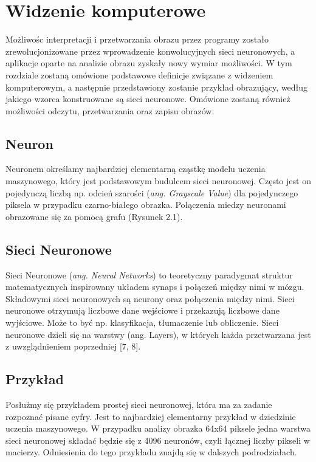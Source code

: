 \documentclass[openright]{xmgr}
\begin{document}
	


\chapter{Widzenie komputerowe  }

\indent \indent Możliwośc interpretacji i przetwarzania obrazu przez programy zostało zrewolucjonizowane przez wprowadzenie konwolucyjnych sieci neuronowych, a aplikacje oparte na analizie obrazu zyskały nowy wymiar możliwości. W tym rozdziale zostaną omówione podstawowe definicje związane z widzeniem komputerowym, a następnie przedstawiony zostanie przykład obrazujący, według jakiego wzorca konstruowane są sieci neuronowe. Omówione zostaną również 
możliwości odczytu, przetwarzania oraz zapisu obrazów.

\section{Neuron  \label{s:dsssl}}

\indent \indent Neuronem określamy najbardziej elementarną cząstkę modelu uczenia maszynowego, który jest podstawowym budulcem sieci neuronowej. Często jest on pojedynczą liczbą np. odcień szarości (\textit{ang. Grayscale Value}) dla pojedynczego piksela w przypadku czarno-białego obrazka. Połączenia miedzy neuronami obrazowane się za pomocą grafu (Rysunek 2.1).

\section{Sieci Neuronowe   \label{s:dsssl}}

\indent \indent Sieci Neuronowe (\textit{ang. Neural Networks}) to teoretyczny paradygmat struktur matematycznych inspirowany układem synaps i połączeń między nimi w mózgu. Składowymi sieci neuronowych są neurony oraz połączenia między nimi. Sieci neuronowe otrzymują liczbowe dane wejściowe i przekazują liczbowe dane wyjściowe. Może to być np. klasyfikacja, tłumaczenie lub obliczenie. Sieci neuronowe dzieli się na warstwy (ang. Layers), w których każda przetwarzana jest z uwzglądnieniem poprzedniej [7, 8].



\section{Przykład  \label{s:dsssl}}

\indent \indent Posłużmy się przykładem prostej sieci neuronowej, która ma za zadanie rozpoznać pisane cyfry. Jest to najbardziej elementarny przykład w dziedzinie uczenia maszynowego.
W przypadku analizy obrazka 64x64 piksele jedna warstwa sieci neuronowej składać będzie się z 4096 neuronów, czyli łącznej liczby pikseli w macierzy. Odniesienia do tego przykładu znajdą się w dalszych podrodziałach.
\end{document}
